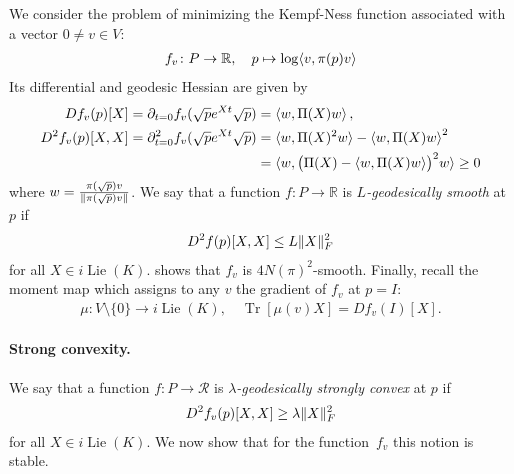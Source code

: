 \documentclass{article}
\DeclareMathOperator{\Lie}{Lie}
\DeclarePairedDelimiter{\norm}{\lVert}{\rVert}
\DeclarePairedDelimiter{\ip}{\langle}{\rangle}
\newcommand{\R}{{\mathbb{R}}}
\newcommand\tr{\operatorname{Tr}}
\newcommand\RR{\mathcal{R}}
\begin{document}
We consider the problem of minimizing the Kempf-Ness function associated with a vector $0\neq v\in V$:
\begin{align*}
  f_v \colon P \to \R, \quad p \mapsto \log \ip{v, \pi(p) v}
\end{align*}
Its differential and geodesic Hessian are given by
\begin{align}
\label{eq:d}
  Df_v(p)[X]
= \partial_{t=0} f_v(\sqrt p e^{Xt} \sqrt p)
&= \braket{w, \Pi(X) w}, \\
\label{eq:d2}
  D^2f_v(p)[X,X]
= \partial^2_{t=0} f_v(\sqrt p e^{Xt} \sqrt p)
&= \braket{w, \Pi(X)^2 w} - \braket{w, \Pi(X) w}^2 \\
\nonumber
&= \braket{w, \bigl(\Pi(X) - \braket{w, \Pi(X) w}\bigr)^2 w} \geq 0
\end{align}
where $w = \frac {\pi(\sqrt p) v}{\norm{\pi(\sqrt p) v}}$.
We say that a function $f\colon P\to\R$ is \emph{$L$-geodesically smooth} at $p$ if
\begin{align*}
  D^2f(p)[X,X] \leq L \norm{X}_F^2
\end{align*}
for all $X\in i\Lie(K)$.
 shows that $f_v$ is $4N(\pi)^2$-smooth.
Finally, recall the moment map which assigns to any $v$ the gradient of $f_v$ at $p=I$:
\begin{align*}
  \mu\colon V\setminus\{0\}\to i\Lie(K), \quad \tr[\mu(v)X] = Df_v(I)[X].
\end{align*}

\paragraph{Strong convexity.}
We say that a function $f\colon P\to\RR$ is \emph{$\lambda$-geodesically strongly convex} at $p$ if
\begin{align*}
  D^2f_v(p)[X,X] \geq \lambda \norm{X}_F^2
\end{align*}
for all $X\in i\Lie(K)$.
We now show that for the function~$f_v$ this notion is stable.
\end{document}
